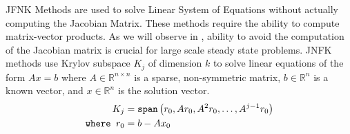 JFNK Methods are used to solve Linear System of Equations without actually computing the Jacobian Matrix. These methods require the ability to compute matrix-vector products. As we will observe in , ability to avoid the computation of the Jacobian matrix is crucial for large scale steady state problems. JNFK methods use Krylov subspace $K_j$ of dimension $k$ to solve linear equations of the form $A x = b$  where $A \in \mathbb{R}^{n \times n}$ is a sparse, non-symmetric matrix, $b \in \mathbb{R}^n$ is a known vector, and $x \in \mathbb{R}^n$ is the solution vector.
%
\begin{align}
  K_j                 & = \texttt{span}\left(r_0, Ar_0, A^2 r_0, \dots, A^{j-1} r_0\right)\label{eq:krylov_subspace} \\
  \texttt{where } r_0 & = b - A x_0
\end{align}
%




